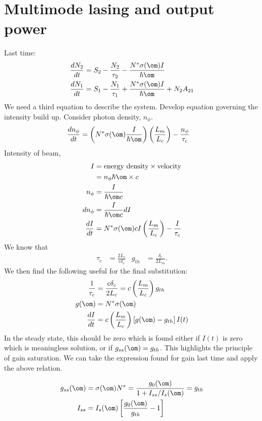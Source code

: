 \documentclass[a4paper, 11pt, normalem]{report}
\begin{document}
\chapter{Multimode lasing and output power}
Last time:
\begin{align}
    \frac{dN_2}{dt} &= S_2 - \frac{N_2}{\tau_2} - \frac{N^*\sigma(\om)I}{\hbar\om} \\
    \frac{dN_1}{dt} &= S_1 - \frac{N_1}{\tau_1} + \frac{N^*\sigma(\om)I}{\hbar\om} + N_2A_{21}
\end{align}
We need a third equation to describe the system.
Develop equation governing the intensity build up.
Consider photon density, $n_\phi$.
\begin{align}
    \frac{dn_\phi}{dt} &= \left(N^*\sigma(\om)\frac{I}{\hbar\om}\right)\left(\frac{L_m}{L_c}\right) - \frac{n_\phi}{\tau_c}
\end{align}
Intensity of beam,
\begin{align}
    I &= \text{energy density}\times\text{velocity} \\
      &= n_\phi\hbar\om\times c \\
    n_\phi &= \frac{I}{\hbar\om c} \\
    dn_\phi &= \frac{I}{\hbar\om c}dI \\
    \frac{dI}{dt} &= N^*\sigma(\om)cI\left(\frac{L_m}{L_c}\right)-\frac{I}{\tau_c}
\end{align}
We know that
\begin{align}
    \tau_c &= \frac{2L_c}{c\delta_c} & g_{th} &= \frac{\delta_c}{2L_m}.
\end{align}
We then find the following useful for the final substitution:
\begin{align}
    \frac{1}{\tau_c} &= \frac{c\delta_c}{2L_c} = c\left(\frac{L_m}{L_c}\right)g_{th} \\
    g(\om) &= N^*\sigma(\om) \\
    \frac{dI}{dt} &= c\left(\frac{L_m}{L_c}\right)\left[g(\om) - g_{th}\right]I(t)
\end{align}
In the steady state, this should be zero which is found either if $I(t)$ is zero which is meaningless solution, or if $g_{ss}(\om) = g_{th}$.
This highlights the principle of gain saturation.
We can take the expression found for gain last time and apply the above relation.
\begin{multicols}{2}
\begin{figure}[H]
    \centering
\end{figure}
\begin{align}
    g_{ss}(\om) &= \sigma(\om)N^* = \frac{g_0(\om)}{1+I_{ss}/I_s(\om)} = g_{th} \\
    I_{ss} &= I_s(\om)\left[\frac{g_0(\om)}{g_{th}}-1\right]
\end{align}
\end{multicols}
\end{document}
